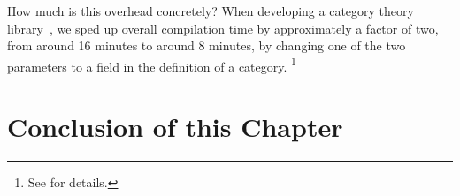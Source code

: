 How much is this overhead concretely?
When developing a category theory library~\cite{category-coq-experience}, we sped up overall compilation time by approximately a factor of two, from around 16 minutes to around 8 minutes, by changing one of the two parameters to a field in the definition of a category.%
\footnote{%
  See  for details.%
}


\section{Conclusion of this Chapter}

